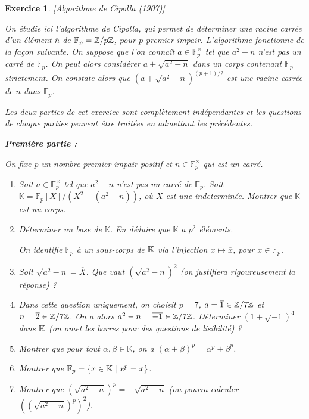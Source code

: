 \documentclass[11pt,a4paper]{article}
\newtheorem{ex}{Exercice}
\newcommand{\F}{\mathbb{F}}
\begin{document}
\begin{ex}\label{Cipolla}[Algorithme de Cipolla (1907)]

On étudie ici l'algorithme de Cipolla, qui permet de déterminer une racine carrée d'un élément $\overline{n}$ de $\F_p=\Z/p\Z$, pour $p$ premier impair. L'algorithme fonctionne de la façon suivante. On suppose que l'on connaît  $a\in \F_p^\times$ tel que $a^2-n$ n'est pas un carré de $ \F_p$. On peut alors considérer $a+\sqrt{a^2-n}$  dans un corps contenant $\F_p$ strictement. On constate alors que $(a+\sqrt{a^2-n})^{(p+1)/2}$ est une racine carrée de $n$ dans $\F_p$. 

Les deux parties de cet exercice sont complètement indépendantes et les questions de chaque parties peuvent être traitées en admettant les précédentes.




\textbf{Première partie :}

On fixe   $p$ un nombre premier impair positif et $n\in \F_p^\times$ qui est un carré.
\begin{enumerate}
\item Soit $a\in \F_p^\times$ tel que $a^2-n$ n'est pas un carré de $\F_p$.  Soit $\mathbb{K}=\F_p[X]/(X^2-(a^2-n))$, où $X$ est une indeterminée. Montrer que $\mathbb{K}$ est un corps.

\item Déterminer un base de $\mathbb{K}$. En déduire que $\mathbb{K}$ a $p^2$ éléments.

On identifie $\F_p$ à un sous-corps de $\mathbb{K}$ via l'injection $x\mapsto \overline{x}$, pour $x\in \F_p$.

\item Soit $\sqrt{a^2-n}=\overline{X}$. Que vaut $(\sqrt{a^2-n})^2$ (on justifiera rigoureusement la réponse) ?


\item Dans cette question uniquement, on choisit $p=7$, $a=\overline{1}\in \mathbb{Z}/7\mathbb{Z}$ et $n=\overline{2}\in \mathbb{Z}/7\mathbb{Z}$. On a alors $a^2-n=\overline{-1}\in \mathbb{Z}/7\mathbb{Z}$. Déterminer $(1+\sqrt{-1})^4$ dans $\mathbb{K}$ (on omet les barres pour des questions de lisibilité) ? 

\item Montrer que pour tout $\alpha,\beta\in \mathbb{K}$, on a $(\alpha+\beta)^p=\alpha^p+\beta^p$.

\item Montrer que $\F_p=\{x\in \KK\mid x^p=x\}$. 

\item Montrer que $(\sqrt{a^2-n})^p=-\sqrt{a^2-n}$ (on pourra calculer $((\sqrt{a^2-n})^p)^2$).


\end{enumerate}
\end{ex}
\end{document}
